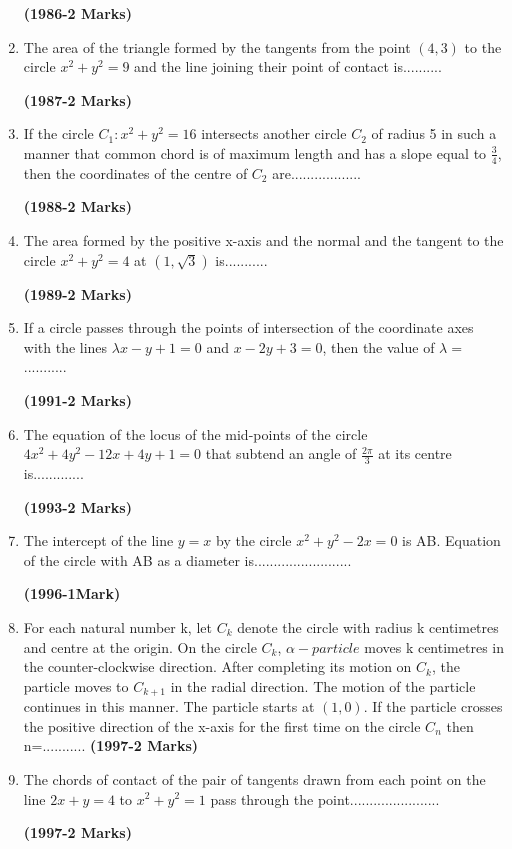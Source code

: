 \documentclass[journal,12pt,twocolumn]{IEEEtran}
\theoremstyle{remark}
\begin{document}
\begin{enumerate}
\hfill{\textbf{(1986-2 Marks)}}
\item The area of the triangle formed by the tangents from the point $(4,3)$ to the circle $x^{2}+y^{2}=9$ and the line joining their point of contact is.......... 

\hfill{\textbf{(1987-2 Marks)}}
\item If the circle $C_1:x^{2}+y^{2}=16$ intersects another circle $C_2$ of radius 5 in such a manner that common chord is of maximum length and has a slope equal to $\frac{3}{4}$, then the coordinates of the centre of $C_2$ are.................. 

\hfill{\textbf{(1988-2 Marks)}}
\item The area formed by the positive x-axis and the normal and the tangent to the circle $x^{2}+y^{2}=4$ at $(1,\sqrt{3})$ is........... 

\hfill{\textbf{(1989-2 Marks)}}
\item If a circle passes through the points of intersection of the coordinate axes with the lines $\lambda x-y+1=0$ and $x-2y+3=0$, then the value of $\lambda =$........... 

\hfill{\textbf{(1991-2 Marks)}}
\item The equation of the locus of the mid-points of the circle $4x^{2}+4y^{2}-12x+4y+1=0$ that subtend an angle of $\frac{2\pi}{3}$ at its centre is............. 

\hfill{\textbf{(1993-2 Marks)}}
\item The intercept of the line $y=x$ by the circle $x^{2}+y^{2}-2x=0$ is AB. Equation of the circle with AB as a diameter is.........................

\hfill{\textbf{(1996-1Mark)}}
\item For each natural number k, let $C_k$ denote the circle with radius k centimetres and centre at the origin. On the circle $C_k$, $\alpha-particle$ moves k centimetres in the counter-clockwise direction. After completing its motion on $C_k$, the particle moves to $C_{k+1}$ in the radial direction. The motion of the particle continues in this manner. The particle starts at $(1,0)$. If the particle crosses the positive direction of the x-axis for the first time on the circle $C_n$ then n=...........
\hfill{\textbf{(1997-2 Marks)}}
\item The chords of contact of the pair of tangents drawn from each point on the line $2x+y=4$ to $x^{2}+y^{2}=1$ pass through the point....................... 

\hfill{\textbf{(1997-2 Marks)}}
\end{enumerate}
\end{document}
